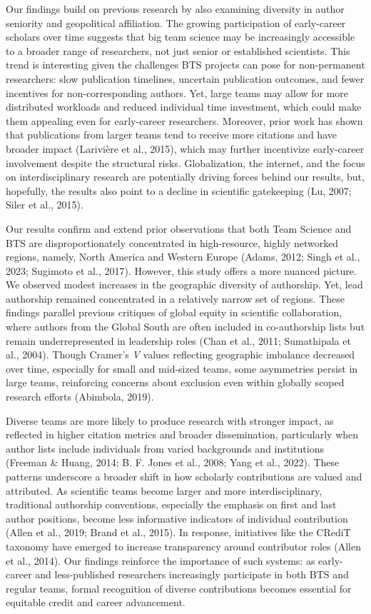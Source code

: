 \documentclass[
  man,floatsintext]{apa7}
\begin{document}
Our findings build on previous research by also examining diversity in
author seniority and geopolitical affiliation. The growing participation
of early-career scholars over time suggests that big team science may be
increasingly accessible to a broader range of researchers, not just
senior or established scientists. This trend is interesting given the
challenges BTS projects can pose for non-permanent researchers: slow
publication timelines, uncertain publication outcomes, and fewer
incentives for non-corresponding authors. Yet, large teams may allow for
more distributed workloads and reduced individual time investment, which
could make them appealing even for early-career researchers. Moreover,
prior work has shown that publications from larger teams tend to receive
more citations and have broader impact (Larivière et al., 2015), which may
further incentivize early-career involvement despite the structural
risks. Globalization, the internet, and the focus on interdisciplinary
research are potentially driving forces behind our results, but,
hopefully, the results also point to a decline in scientific gatekeeping
(Lu, 2007; Siler et al., 2015).

Our results confirm and extend prior observations that both Team Science
and BTS are disproportionately concentrated in high-resource, highly
networked regions, namely, North America and Western Europe (Adams, 2012; Singh et al., 2023; Sugimoto et al., 2017). However, this study offers a more nuanced
picture. We observed modest increases in the geographic diversity of
authorship. Yet, lead authorship remained concentrated in a relatively
narrow set of regions. These findings parallel previous critiques of
global equity in scientific collaboration, where authors from the Global
South are often included in co-authorship lists but remain
underrepresented in leadership roles (Chan et al., 2011; Sumathipala et al., 2004).
Though Cramer's \emph{V} values reflecting geographic imbalance decreased
over time, especially for small and mid-sized teams, some asymmetries
persist in large teams, reinforcing concerns about exclusion even within
globally scoped research efforts (Abimbola, 2019).

Diverse teams are more likely to produce research with stronger impact,
as reflected in higher citation metrics and broader dissemination,
particularly when author lists include individuals from varied
backgrounds and institutions (Freeman \& Huang, 2014; B. F. Jones et al., 2008; Yang et al., 2022).
These patterns underscore a broader shift in how scholarly contributions
are valued and attributed. As scientific teams become larger and more
interdisciplinary, traditional authorship conventions, especially the
emphasis on first and last author positions, become less informative
indicators of individual contribution (Allen et al., 2019; Brand et al., 2015). In
response, initiatives like the CRediT taxonomy have emerged to increase
transparency around contributor roles (Allen et al., 2014). Our findings
reinforce the importance of such systems: as early-career and
less-published researchers increasingly participate in both BTS and
regular teams, formal recognition of diverse contributions becomes
essential for equitable credit and career advancement.
\end{document}
